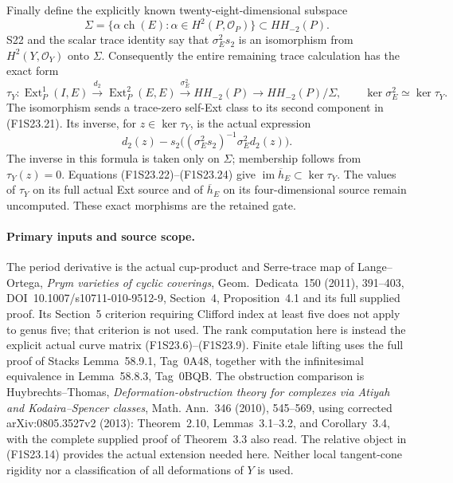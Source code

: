 Finally define the explicitly known twenty-eight-dimensional
subspace
\[
 \Sigma=\{\alpha\operatorname{ch}(E):
                    \alpha\in H^2(P,\mathcal O_P)\}\subset HH_{-2}(P).
 \tag{F1S23.23}
\]
S22 and the scalar trace identity say that
$\sigma_E^2s_2$ is an isomorphism from
$H^2(Y,\mathcal O_Y)$ onto $\Sigma$. Consequently the entire
remaining trace calculation has the exact form
\[
 \tau_Y:\operatorname{Ext}^1_P(I,E)
       \xrightarrow{d_2}\operatorname{Ext}^2_P(E,E)
       \xrightarrow{\sigma_E^2}HH_{-2}(P)
       \longrightarrow HH_{-2}(P)/\Sigma,
 \qquad \ker\sigma_E^2\simeq\ker\tau_Y.
 \tag{F1S23.24}
\]
The isomorphism sends a trace-zero self-Ext class to its
second component in (F1S23.21). Its inverse, for
$z\in\ker\tau_Y$, is the actual expression
\[
       d_2(z)-s_2\bigl((\sigma_E^2s_2)^{-1}
                                      \sigma_E^2d_2(z)\bigr).
 \tag{F1S23.25}
\]
The inverse in this formula is taken only on $\Sigma$;
membership follows from $\tau_Y(z)=0$. Equations
(F1S23.22)--(F1S23.24) give
$\operatorname{im}\overline h_E\subset\ker\tau_Y$.
The values of $\tau_Y$ on its full actual Ext source and
of $\overline h_E$ on its four-dimensional source remain
uncomputed. These exact morphisms are the retained gate.

\paragraph{Primary inputs and source scope.}
The period derivative is the actual cup-product and Serre-trace
map of Lange--Ortega, \emph{Prym varieties of cyclic coverings},
Geom.\ Dedicata~150 (2011), 391--403,
DOI~10.1007/s10711-010-9512-9,
Section~4, Proposition~4.1 and its full supplied proof.
Its Section~5 criterion requiring Clifford index at least five
does not apply to genus five; that criterion is not used.
The rank computation here is instead the explicit actual curve
matrix (F1S23.6)--(F1S23.9).
Finite etale lifting uses the full proof of Stacks
Lemma~58.9.1, Tag~0A48, together with the infinitesimal
equivalence in Lemma~58.8.3, Tag~0BQB.
The obstruction comparison is Huybrechts--Thomas,
\emph{Deformation-obstruction theory for complexes via Atiyah
and Kodaira--Spencer classes}, Math. Ann.~346 (2010),
545--569, using corrected arXiv:0805.3527v2 (2013):
Theorem~2.10, Lemmas~3.1--3.2, and Corollary~3.4, with
the complete supplied proof of Theorem~3.3 also read.
The relative object in (F1S23.14) provides the actual extension
needed here. Neither local tangent-cone rigidity nor a
classification of all deformations of $Y$ is used.
